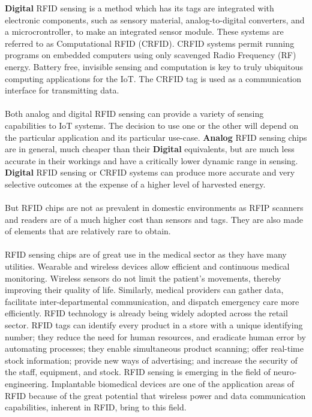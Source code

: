 \documentclass[12pt, letterpaper]{article}
\begin{document}
\textbf{Digital} RFID sensing is a method which has its tags are integrated with electronic components, such as sensory material,
analog-to-digital converters, and a microcrontroller, to make an integrated sensor module.
These systems are referred to as Computational RFID (CRFID). CRFID systems permit running
programs on embedded computers using only scavenged Radio Frequency (RF) energy. Battery
free, invisible sensing and computation is key to truly ubiquitous computing applications for
the IoT. The CRFID tag is used as a communication interface for transmitting data.
\\ \ \\
Both analog and digital RFID sensing can provide a variety of sensing capabilities to IoT systems.
The decision to use one or the other will depend on the particular application and its particular use-case.
\textbf{Analog} RFID sensing chips are in general, much cheaper than their \textbf{Digital} equivalents, but are 
much less accurate in their workings and have a critically lower dynamic range in sensing.
\textbf{Digital} RFID sensing or CRFID systems can produce
more accurate and very selective outcomes at the expense of a higher level of harvested energy.
\\ \ \\
But RFID chips are not as prevalent in domestic environments as RFIP scanners and readers are of a much higher cost than
sensors and tags. They are also made of elements that are relatively rare to obtain.
\\ \ \\
RFID sensing chips are of great use in the medical sector as they have many utilities.
Wearable and wireless devices allow efficient and continuous medical
monitoring. Wireless sensors do not limit the patient’s movements, thereby improving their quality
of life. Similarly, medical providers can gather data, facilitate inter-departmental communication,
and dispatch emergency care more efficiently.
RFID technology is already being widely adopted across the retail sector. RFID tags can
identify every product in a store with a unique identifying number; they reduce the need for human
resources, and eradicate human error by automating processes; they enable simultaneous product
scanning; offer real-time stock information; provide new ways of advertising; and increase the security
of the staff, equipment, and stock.   
RFID sensing is emerging in the field of neuro-engineering. Implantable
biomedical devices are one of the application areas of RFID because of the great
potential that wireless power and data communication capabilities, inherent in RFID, bring to this field.
\end{document}
